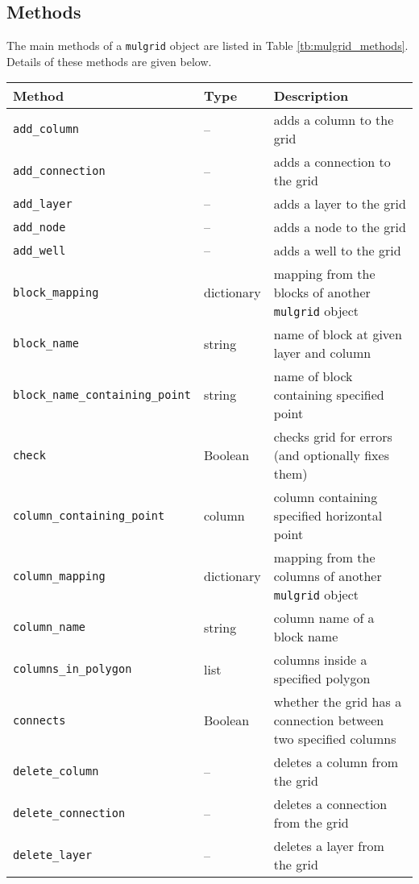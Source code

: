 \subsection{Methods}
\label{mulgridmethods}

The main methods of a \texttt{mulgrid} object are listed in Table \ref{tb:mulgrid_methods}.  Details of these methods are given below.

\begin{center}
\begin{longtable}{|l|l|p{70mm}|}
  \hline
  \textbf{Method} & \textbf{Type} & \textbf{Description}\\
  \hline
  \texttt{add\_column} & -- & adds a column to the grid\\ 
  \texttt{add\_connection} & -- & adds a connection to the grid\\ 
  \texttt{add\_layer} & -- & adds a layer to the grid\\ 
  \texttt{add\_node} & -- & adds a node to the grid\\ 
  \texttt{add\_well} & -- & adds a well to the grid\\ 
  \texttt{block\_mapping} & dictionary & mapping from the blocks of another \texttt{mulgrid} object\\
  \texttt{block\_name} & string & name of block at given layer and column\\
  \texttt{block\_name\_containing\_point} & string & name of block containing specified point\\
  \texttt{check} & Boolean & checks grid for errors (and optionally fixes them)\\ 
  \texttt{column\_containing\_point} & column & column containing specified horizontal point\\ 
  \texttt{column\_mapping} & dictionary & mapping from the columns of another \texttt{mulgrid} object\\
  \texttt{column\_name} & string & column name of a block name\\ 
  \texttt{columns\_in\_polygon} & list & columns inside a specified polygon\\ 
  \texttt{connects} & Boolean & whether the grid has a connection between two specified columns\\ 
  \texttt{delete\_column} & -- & deletes a column from the grid\\ 
  \texttt{delete\_connection} & -- & deletes a connection from the grid\\ 
  \texttt{delete\_layer} & -- & deletes a layer from the grid\\ 

\end{longtable}
\end{center}
